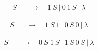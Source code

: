 \documentclass{article}
\begin{document}
\begin{align*}
S \quad &\to \quad 1\ S\ \vert\ 0\ 1\ S\ \vert\ \lambda
\end{align*}

\begin{align*}
S \quad &\to \quad 1\ S\ 1\ \vert\ 0\ S\ 0\ \vert\ \lambda
\end{align*}

\begin{align*}
S \quad &\to \quad 0\ S\ 1\ S\ \vert\ 1\ S\ 0\ S\ \vert\ \lambda
\end{align*}
\end{document}

